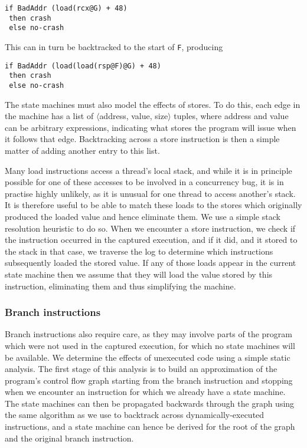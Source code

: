 \documentclass[10pt,twocolumn,preprint,natbib,authoryear]{sigplanconf}
\newcommand{\editorial}[1]{}
\begin{document}
\begin{verbatim}
if BadAddr (load(rcx@G) + 48)
 then crash
 else no-crash
\end{verbatim}

\noindent
This can in turn be backtracked to the start of \verb|F|, producing

\begin{verbatim}
if BadAddr (load(load(rsp@F)@G) + 48)
 then crash
 else no-crash
\end{verbatim}

\noindent
The state machines must also model the effects of stores.  To do this,
each edge in the machine has a list of $\langle{}$address, value,
size$\rangle{}$ tuples, where address and value can be arbitrary
expressions, indicating what stores the program will issue when it
follows that edge.  Backtracking across a store instruction is then a
simple matter of adding another entry to this list.\editorial{I used
  to have a bit about dropping deep loads, but having run the
  experiments, it turns out that really doesn't matter.  Which is odd,
  because it used to be a major optimization, but I guess some of the
  improvements to the alias resolution stuff must have obviated it.}

Many load instructions access a thread's local stack, and while it is
in principle possible for one of these accesses to be involved in a
concurrency bug, it is in practise highly unlikely, as it is unusual
for one thread to access another's stack.  It is therefore useful to
be able to match these loads to the stores which originally produced
the loaded value and hence eliminate them.  We use a simple stack
resolution heuristic to do so.  When we encounter a store instruction,
we check if the instruction occurred in the captured execution, and if
it did, and it stored to the stack in that case, we traverse the log
to determine which instructions subsequently loaded the stored value.
If any of those loads appear in the current state machine then we
assume that they will load the value stored by this instruction,
eliminating them and thus simplifying the machine.\editorial{Would
  also benefit from some eval.}

\subsubsection{Branch instructions}
\label{sect:branch_instrs}
Branch instructions also require care, as they may involve parts of
the program which were not used in the captured execution, for which
no state machines will be available.  We determine the effects of
unexecuted code using a simple static analysis.  The first stage of
this analysis is to build an approximation of the program's control
flow graph starting from the branch instruction and stopping when we
encounter an instruction for which we already have a state machine.
The state machines can then be propagated backwards through the graph
using the same algorithm as we use to backtrack across
dynamically-executed instructions, and a state machine can hence be
derived for the root of the graph and the original branch instruction.
\end{document}
